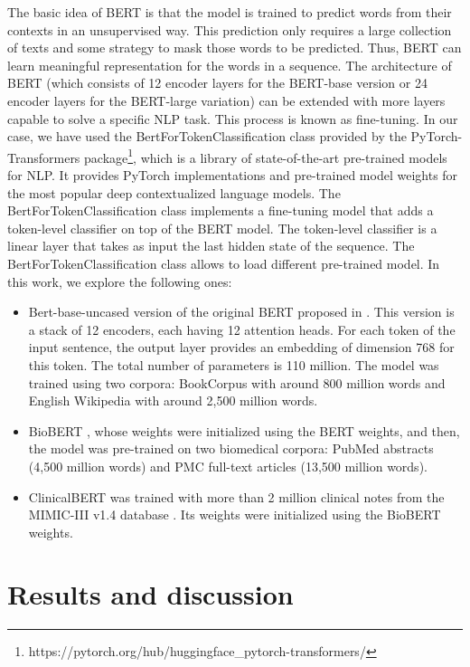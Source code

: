 \documentclass[preprint,12pt]{elsarticle}
\begin{document}
The basic idea of BERT is that the model is trained to predict words from their contexts in an unsupervised way. This prediction only requires a large collection of texts and some strategy to mask those words to be predicted.  Thus, BERT can learn meaningful representation for the words in a sequence. The architecture of BERT (which consists of 12 encoder layers for the BERT-base version or 24 encoder layers for the BERT-large variation) can be extended with more layers capable to solve a specific NLP task. 
This process is known as fine-tuning. 
In our case, we have used the BertForTokenClassification class provided by the PyTorch-Transformers package\footnote{https://pytorch.org/hub/huggingface\_pytorch-transformers/}, which is a library of state-of-the-art pre-trained models for NLP. It provides PyTorch implementations and pre-trained model weights for the most popular deep contextualized language models.
The BertForTokenClassification class implements a fine-tuning model that adds a token-level classifier on top of the BERT model. The token-level classifier is a linear layer that takes as input the last hidden state of the sequence. 
The BertForTokenClassification class  allows to load different pre-trained model. In this work, we explore the following  ones: 
\begin{itemize}
    \item Bert-base-uncased version of the original BERT proposed in  \cite{devlin-etal-2019-bert}. This version is a stack of 12 encoders, each having 12 attention heads.  For each token of the input sentence, the output layer provides an embedding of dimension 768 for this token. The total number of parameters is 110 million. The model was trained using two corpora: BookCorpus with around 800 million words and English Wikipedia with around 2,500 million words.
    
    \item BioBERT  \cite{lee2020biobert}, whose weights were initialized using the BERT weights, and then, the model was pre-trained on two biomedical corpora: PubMed abstracts (4,500 million words) and PMC full-text articles (13,500 million words). 
    \item ClinicalBERT  \cite{alsentzer-etal-2019-publicly} was trained with more than 2 million clinical notes from the MIMIC-III v1.4 database \cite{johnson2016mimic}. Its weights were initialized using the BioBERT weights. 
    
\end{itemize}


\section{Results and discussion}
\label{sec:eval}
\end{document}
